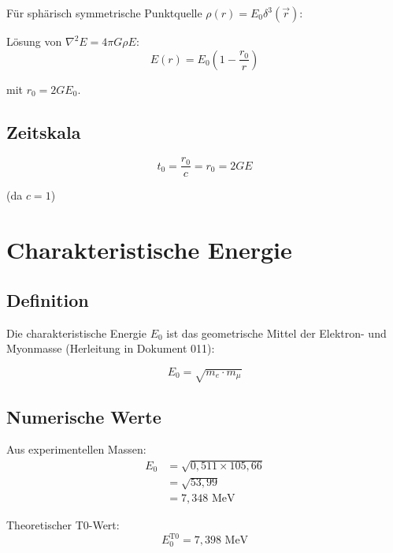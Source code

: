 	Für sphärisch symmetrische Punktquelle $\rho(r) = E_0 \delta^3(\vec{r})$:
	
	Lösung von $\nabla^2 E = 4\pi G \rho E$:
	\begin{equation}
		E(r) = E_0 \left(1 - \frac{r_0}{r}\right)
	\end{equation}
	
	mit $r_0 = 2GE_0$.
	
	\subsection{Zeitskala}
	
	\begin{equation}
		t_0 = \frac{r_0}{c} = r_0 = 2GE
	\end{equation}
	
	(da $c = 1$)
	
	\section{Charakteristische Energie}
	\label{sec:characteristic_energy}
	
	\subsection{Definition}
	
	Die charakteristische Energie $E_0$ ist das geometrische Mittel der Elektron- und Myonmasse (Herleitung in Dokument 011):
	
	\begin{equation}
		\boxed{E_0 = \sqrt{m_e \cdot m_\mu}}
		\label{eq:E0_definition}
	\end{equation}
	
	\subsection{Numerische Werte}
	
	Aus experimentellen Massen:
	\begin{align}
		E_0 &= \sqrt{0{,}511 \times 105{,}66} \\
		&= \sqrt{53{,}99} \\
		&= 7{,}348 \text{ MeV}
	\end{align}
	
	Theoretischer T0-Wert:
	\begin{equation}
		E_0^{\text{T0}} = 7{,}398 \text{ MeV}
	\end{equation}
	
